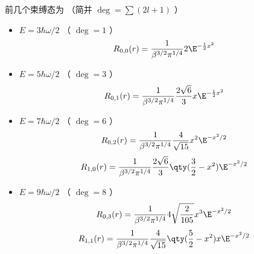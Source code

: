 前几个束缚态为 （简并 $\deg  = \sum (2l + 1)$ ）
\begin{itemize}
\item $E = 3\hbar \omega /2$ （ $\deg  = 1$ ）
\begin{equation}
R_{0,0}(r) = \frac{1}{\beta^{3/2} \pi^{1/4}} 2\E^{-\frac12 x^2}
\end{equation}

\item $E = 5\hbar \omega /2$ （ $\deg  = 3$ ）
\begin{equation}
R_{0,1}(r) = \frac{1}{\beta^{3/2} \pi^{1/4}} \frac{2\sqrt 6}{3} x \E^{-\frac12 x^2}
\end{equation}

\item $E = 7\hbar \omega /2$ （ $\deg  = 6$ ）
\begin{equation}
R_{0,2}(r) = \frac{1}{\beta^{3/2} \pi^{1/4}} \frac{4}{\sqrt{15}} x^2 \E^{- x^2/2}
\end{equation}
\begin{equation}
R_{1,0}(r) = \frac{1}{\beta^{3/2} \pi^{1/4}} \frac{2\sqrt 6}{3} \qty(\frac32 - x^2) \E^{-x^2/2}
\end{equation}

\item $E = 9\hbar\omega /2$ （ $\deg  = 8$ ）
\begin{equation}
R_{0,3}(r) = \frac{1}{\beta^{3/2} \pi^{1/4}} 4\sqrt{\frac{2}{105}} x^3 \E^{-x^2/2}
\end{equation}
\begin{equation}
R_{1,1}(r) = \frac{1}{\beta^{3/2} \pi^{1/4}} \frac{4}{\sqrt{15}} \qty(\frac52 - x^2) x \E^{-x^2/2}
\end{equation}
\end{itemize}
